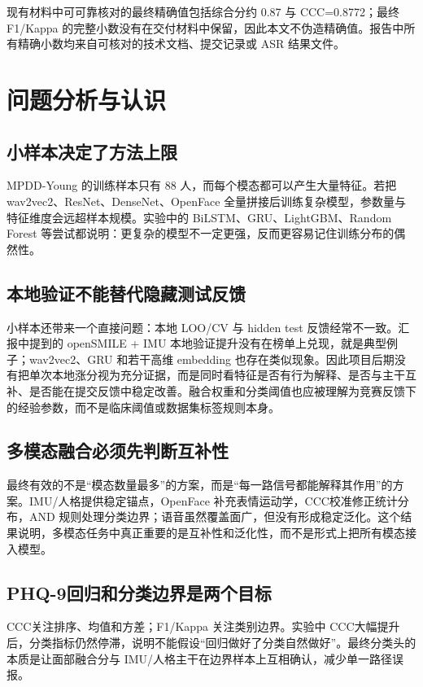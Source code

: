 \documentclass[UTF8,zihao=-4,fontset=windows]{ctexart}
\newcommand{\phq}{PHQ-9}
\newcommand{\ccc}{CCC}
\begin{document}
现有材料中可可靠核对的最终精确值包括综合分约 0.87 与 \ccc=0.8772；最终 F1/Kappa 的完整小数没有在交付材料中保留，因此本文不伪造精确值。报告中所有精确小数均来自可核对的技术文档、提交记录或 ASR 结果文件。

\section{问题分析与认识}

\subsection{小样本决定了方法上限}

MPDD-Young 的训练样本只有 88 人，而每个模态都可以产生大量特征。若把 wav2vec2、ResNet、DenseNet、OpenFace 全量拼接后训练复杂模型，参数量与特征维度会远超样本规模。实验中的 BiLSTM、GRU、LightGBM、Random Forest 等尝试都说明：更复杂的模型不一定更强，反而更容易记住训练分布的偶然性。

\subsection{本地验证不能替代隐藏测试反馈}

小样本还带来一个直接问题：本地 LOO/CV 与 hidden test 反馈经常不一致。汇报中提到的 openSMILE + IMU 本地验证提升没有在榜单上兑现，就是典型例子；wav2vec2、GRU 和若干高维 embedding 也存在类似现象。因此项目后期没有把单次本地涨分视为充分证据，而是同时看特征是否有行为解释、是否与主干互补、是否能在提交反馈中稳定改善。融合权重和分类阈值也应被理解为竞赛反馈下的经验参数，而不是临床阈值或数据集标签规则本身。

\subsection{多模态融合必须先判断互补性}

最终有效的不是“模态数量最多”的方案，而是“每一路信号都能解释其作用”的方案。IMU/人格提供稳定锚点，OpenFace 补充表情运动学，\ccc 校准修正统计分布，AND 规则处理分类边界；语音虽然覆盖面广，但没有形成稳定泛化。这个结果说明，多模态任务中真正重要的是互补性和泛化性，而不是形式上把所有模态接入模型。

\subsection{\phq 回归和分类边界是两个目标}

\ccc 关注排序、均值和方差；F1/Kappa 关注类别边界。实验中 \ccc 大幅提升后，分类指标仍然停滞，说明不能假设“回归做好了分类自然做好”。最终分类头的本质是让面部融合分与 IMU/人格主干在边界样本上互相确认，减少单一路径误报。
\end{document}
